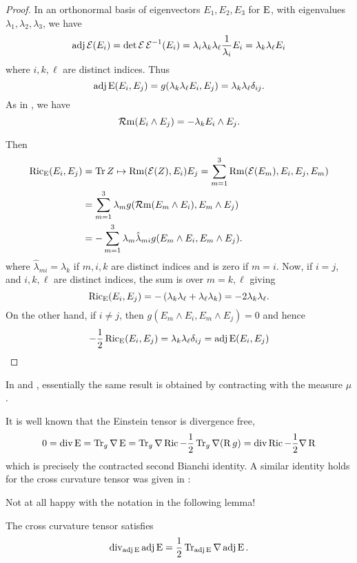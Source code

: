 \documentclass[a4paper, 12pt]{amsart}
\begin{document}
\begin{proof}
In an orthonormal basis of eigenvectors \(E_1, E_2, E_3\) for \(\operatorname{E}\), with eigenvalues \(\lambda_1, \lambda_2, \lambda_3\), we have
\[
\operatorname{adj}\operatorname{\mathcal{E}} (E_i) = \det\operatorname{\mathcal{E}} \operatorname{\mathcal{E}}^{-1}(E_i) = \lambda_i \lambda_k \lambda_{\ell} \frac{1}{\lambda_i} E_i = \lambda_k \lambda_{\ell} E_i
\]
where \(i,k,\ell\) are distinct indices. Thus
\[
\operatorname{adj}\operatorname{E}(E_i, E_j) = g(\lambda_k \lambda_{\ell} E_i, E_j) = \lambda_k \lambda_{\ell} \delta_{ij}.
\]
As in , we have
\[
\operatorname{\mathcal{R}m}(E_i \wedge E_j) = -\lambda_k E_i \wedge E_j.
\]

Then
\[
\begin{split}
\operatorname{Ric}_{\operatorname{E}}(E_i, E_j) &= \operatorname{Tr} Z \mapsto \operatorname{Rm}(\operatorname{\mathcal{E}}(Z), E_i) E_j = \sum_{m=1}^3 \operatorname{Rm}(\operatorname{\mathcal{E}}(E_m), E_i, E_j, E_m) \\
&= \sum_{m=1}^3 \lambda_m g(\operatorname{\mathcal{R}m}(E_m \wedge E_i), E_m \wedge E_j) \\
&= - \sum_{m=1}^3 \lambda_m \hat{\lambda}_{mi} g(E_m \wedge E_i, E_m \wedge E_j).
\end{split}
\]
where \(\hat{\lambda}_{mi} = \lambda_k\) if \(m,i,k\) are distinct indices and is zero if \(m=i\). Now, if \(i = j\), and \(i, k, \ell\) are distinct indices, the sum is over \(m=k, \ell\) giving
\[
\operatorname{Ric}_{\operatorname{E}}(E_i, E_j) = -\left(\lambda_k \lambda_{\ell} + \lambda_{\ell} \lambda_k\right) = -2\lambda_k \lambda_{\ell}.
\]
On the other hand, if \(i \ne j\), then \(g(E_m \wedge E_i, E_m \wedge E_j) = 0\) and hence
\[
-\frac{1}{2} \operatorname{Ric}_{\operatorname{E}}(E_i, E_j) =  \lambda_k \lambda_{\ell} \delta_{ij} = \operatorname{adj}\operatorname{E}(E_i, E_j)
\]
\end{proof}

\begin{rem}
In \cite[Lemma 3]{MR2055396} and \cite[Equation (3)]{MR2207496}, essentially the same result is obtained by contracting with the measure \(\mu\).
\end{rem}

It is well known that the Einstein tensor is divergence free,
\[
0 = \operatorname{div} \operatorname{E} = \operatorname{Tr}_g \nabla \operatorname{E} = \operatorname{Tr}_g \nabla \operatorname{Ric} - \frac{1}{2} \operatorname{Tr}_g \nabla (\operatorname{R} g) = \operatorname{div} \operatorname{Ric} - \frac{1}{2} \nabla \operatorname{R}
\]
which is precisely the contracted second Bianchi identity. A similar identity holds for the cross curvature tensor was given in \cite[Lemma 1]{MR2055396}:

{\color{red} Not at all happy with the notation in the following lemma!}

\begin{lemma}
\label{lem:xcf_hamilton_integrability}
The cross curvature tensor satisfies
\[
\operatorname{div}_{\operatorname{adj}\operatorname{E}} \operatorname{adj}\operatorname{E} = \frac{1}{2} \operatorname{Tr}_{\operatorname{adj}\operatorname{E}} \nabla \operatorname{adj}\operatorname{E}.
\]
\end{lemma}
\end{document}
